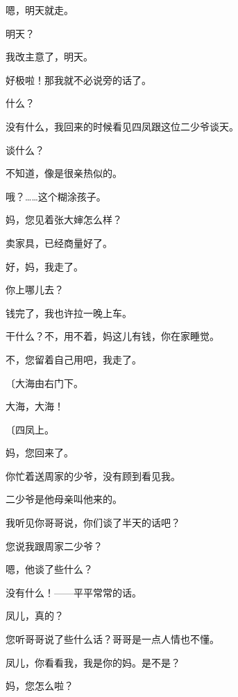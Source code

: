 嗯，明天就走。

明天？

我改主意了，明天。

好极啦！那我就不必说旁的话了。

什么？

没有什么，我回来的时候看见四凤跟这位二少爷谈天。

谈什么？

不知道，像是很亲热似的。

哦？……这个糊涂孩子。

妈，您见着张大婶怎么样？

卖家具，已经商量好了。

好，妈，我走了。

你上哪儿去？

钱完了，我也许拉一晚上车。

干什么？不，用不着，妈这儿有钱，你在家睡觉。

不，您留着自己用吧，我走了。

{\fangsong〔大海由右门下。}

大海，大海！

{\fangsong〔四凤上。}

妈，您回来了。

你忙着送周家的少爷，没有顾到看见我。

二少爷是他母亲叫他来的。

我听见你哥哥说，你们谈了半天的话吧？

您说我跟周家二少爷？

嗯，他谈了些什么？

没有什么！——平平常常的话。

凤儿，真的？

您听哥哥说了些什么话？哥哥是一点人情也不懂。

凤儿，你看看我，我是你的妈。是不是？

妈，您怎么啦？

